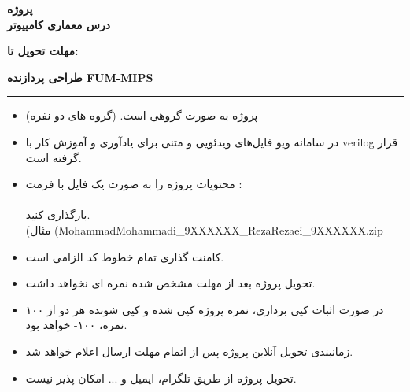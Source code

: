
\def \Subject {پروژه}
\def \Course {درس معماری کامپیوتر}
\def \Report {طراحی پردازنده FUM-MIPS}

\begin{center}
\vspace{.4cm}
{\bf {\huge \Subject}}\\
{\bf \Large \Course}
\vspace{.2cm}
\end{center}
{\bf مهلت تحویل تا: \date{1402/04/01}}    
\hspace{\fill} 
{\bf \Report} \\
\hrule
\vspace{0.8cm}

\begin{itemize}
    \item پروژه به صورت گروهی است. (گروه های دو نفره) 
    \item در سامانه ویو فایل‌های ویدئویی و متنی برای یادآوری و آموزش کار با verilog قرار گرفته است.
    \item  محتویات پروژه را به صورت یک فایل با فرمت : \\\\ بارگذاری کنید.
    \\(مثال (MohammadMohammadi\_9XXXXXX\_RezaRezaei\_9XXXXXX.zip
    \item کامنت گذاری تمام خطوط کد الزامی است.
    \item تحویل پروژه بعد از مهلت مشخص شده نمره ای نخواهد داشت.
    \item در صورت اثبات کپی برداری، نمره پروژه کپی شده و کپی شونده هر دو از ۱۰۰ نمره، ۱۰۰- خواهد بود.
    \item زمانبندی تحویل آنلاین پروژه پس از اتمام مهلت ارسال اعلام خواهد شد.
    \item تحویل پروژه از طریق تلگرام، ایمیل و ... امکان پذیر نیست.
\end{itemize}

